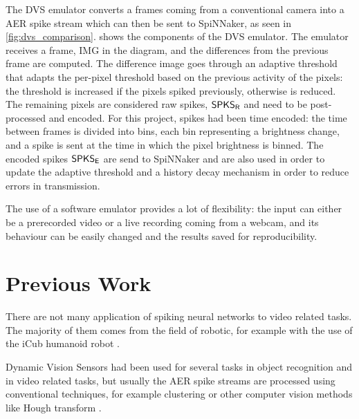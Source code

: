 The DVS emulator converts a frames coming from a conventional camera into a AER spike stream which can then be sent to SpiNNaker, as seen in \cref{fig:dvs_comparison}.  
 shows the components of the DVS emulator. The emulator receives a frame, \textsf{IMG} in the diagram, and the differences from the previous frame are computed. The difference image goes through an adaptive threshold that adapts the per-pixel threshold based on the previous activity of the pixels: the threshold is increased if the pixels spiked previously, otherwise is reduced. The remaining pixels are considered raw spikes, $\text{\textsf{SPKS}}_\text{\textsf{R}}$ and need to be post-processed and encoded. For this project, spikes had been time encoded: the time between frames is divided into bins, each bin representing a brightness change, and a spike is sent at the time in which the pixel brightness is binned. The encoded spikes $\text{\textsf{SPKS}}_\text{\textsf{E}}$ are send to SpiNNaker and are also used in order to update the adaptive threshold and a history decay mechanism in order to reduce errors in transmission. 

The use of a software emulator provides a lot of flexibility: the input can either be a prerecorded video or a live recording coming from a webcam, and its behaviour can be easily changed and the results saved for reproducibility. 





\section{Previous Work}
There are not many application of spiking neural networks to video related tasks. The majority of them comes from the field of robotic, for example with the use of the iCub humanoid robot \cite{HernandezGarcia2018}.

Dynamic Vision Sensors had been used for several tasks in object recognition and in video related tasks, but usually the AER spike streams are processed using conventional techniques, for example clustering or other computer vision methods like Hough transform \cite{Glover2016, Glover2017}.